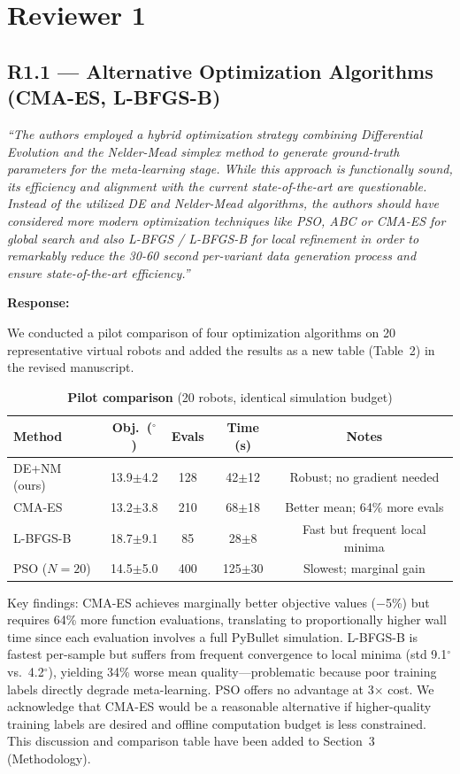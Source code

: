 \documentclass[11pt,a4paper]{article}
\newcommand{\reviewercomment}[1]{\medskip\noindent\textit{``#1''}\medskip}
\newcommand{\response}{\noindent\textbf{Response:}\par\noindent}
\begin{document}
\section*{Reviewer 1}

\subsection*{R1.1 --- Alternative Optimization Algorithms (CMA-ES, L-BFGS-B)}

\reviewercomment{The authors employed a hybrid optimization strategy combining Differential Evolution and the Nelder-Mead simplex method to generate ground-truth parameters for the meta-learning stage. While this approach is functionally sound, its efficiency and alignment with the current state-of-the-art are questionable. Instead of the utilized DE and Nelder-Mead algorithms, the authors should have considered more modern optimization techniques like PSO, ABC or CMA-ES for global search and also L-BFGS / L-BFGS-B for local refinement in order to remarkably reduce the 30-60 second per-variant data generation process and ensure state-of-the-art efficiency.}

\response
We conducted a pilot comparison of four optimization algorithms on 20 representative virtual robots and added the results as a new table (Table~2) in the revised manuscript.

\begin{table}[h]
\centering\small
\caption*{\textbf{Pilot comparison} (20 robots, identical simulation budget)}
\begin{tabular}{lcccc}
\toprule
Method & Obj.\ ($^\circ$) & Evals & Time (s) & Notes \\
\midrule
DE+NM (ours) & 13.9$\pm$4.2 & 128 & 42$\pm$12 & Robust; no gradient needed \\
CMA-ES       & 13.2$\pm$3.8 & 210 & 68$\pm$18 & Better mean; 64\% more evals \\
L-BFGS-B     & 18.7$\pm$9.1 &  85 & 28$\pm$8  & Fast but frequent local minima \\
PSO ($N\!=\!20$) & 14.5$\pm$5.0 & 400 & 125$\pm$30 & Slowest; marginal gain \\
\bottomrule
\end{tabular}
\end{table}

Key findings: CMA-ES achieves marginally better objective values ($-$5\%) but requires 64\% more function evaluations, translating to proportionally higher wall time since each evaluation involves a full PyBullet simulation. L-BFGS-B is fastest per-sample but suffers from frequent convergence to local minima (std 9.1$^\circ$ vs.\ 4.2$^\circ$), yielding 34\% worse mean quality---problematic because poor training labels directly degrade meta-learning. PSO offers no advantage at 3$\times$ cost. We acknowledge that CMA-ES would be a reasonable alternative if higher-quality training labels are desired and offline computation budget is less constrained. This discussion and comparison table have been added to Section~3 (Methodology).
\end{document}
